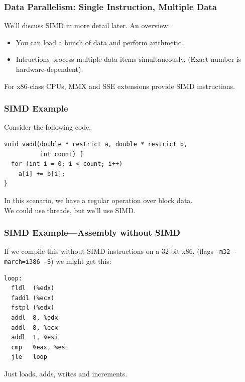 \documentclass[aspectratio=43]{beamer}
\newenvironment{changemargin}[1]{%
  \begin{list}{}{%
    \setlength{\topsep}{0pt}%
    \setlength{\leftmargin}{#1}%
    \setlength{\rightmargin}{1em}
    \setlength{\listparindent}{\parindent}%
    \setlength{\itemindent}{\parindent}%
    \setlength{\parsep}{\parskip}%
  }%
  \item[]}{\end{list}}
\begin{document}
\begin{frame}
  \frametitle{Data Parallelism: Single Instruction, Multiple Data}

  \begin{changemargin}{2cm}
    We'll discuss SIMD in more detail later. An overview:
    \begin{itemize}
    \item You can load a bunch of data and perform 
      arithmetic.
    \item Intructions process multiple data items simultaneously.
      (Exact number is hardware-dependent).
    \end{itemize}
    For x86-class CPUs, MMX and SSE extensions provide SIMD instructions.
  \end{changemargin}
\end{frame}

\begin{frame}[fragile]
  \frametitle{SIMD Example}

  \begin{changemargin}{1.5cm}
  Consider the following code:

  \begin{lstlisting}
void vadd(double * restrict a, double * restrict b, 
          int count) {
  for (int i = 0; i < count; i++)
    a[i] += b[i];
}    
  \end{lstlisting}

    In this scenario, we have a regular operation over block data.\\[1em]

    We could use threads, but we'll use SIMD.

  \end{changemargin}
\end{frame}

\begin{frame}[fragile]
  \frametitle{SIMD Example---Assembly without SIMD}

  \begin{changemargin}{1.5cm}
If we compile this without SIMD instructions on a 32-bit x86, (flags {\tt -m32 -march=i386 -S}) we might get this:

  \begin{lstlisting}
loop:
  fldl  (%edx)
  faddl (%ecx)
  fstpl (%edx)
  addl  8, %edx
  addl  8, %ecx
  addl  1, %esi
  cmp   %eax, %esi
  jle   loop
  \end{lstlisting}

   Just loads, adds, writes and increments.
  \end{changemargin}
\end{frame}
\end{document}
